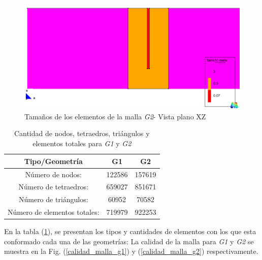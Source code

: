 \documentclass[10pt,a4paper,final]{article}
\begin{document}
%
\begin{figure}[tbhp]
\centerline{\includegraphics[scale=0.4]{img/200m/200_xz_tam_malla}}
\caption{Tamaños de los elementos de la malla \emph{G2}- Vista plano XZ}
\label{200_xz_tam_malla}
\end{figure}
%
%
\begin{table}[tbhp]
\begin{center}\begin{tabular}{ccc}
\hline \textbf{Tipo/Geometría} & \textbf{G1} & \textbf{G2} \\ 
\hline Número de nodos: & 122586 & 157619 \\ 
\hline Número de tetraedros: & 659027 & 851671\\ 
\hline Número de triángulos: & 60952  & 70582 \\ 
\hline Número de elementos totales: & 719979 & 922253 \\ 
\hline 
\end{tabular}\end{center}
\caption{Cantidad de nodos, tetraedros, triángulos y elementos totales para \emph{G1} y \emph{G2}}
\label{tabla_lista_elementos}
\end{table}
%
En la tabla (\ref{tabla_lista_elementos}), se presentan los tipos y cantidades de elementos con los que esta conformado cada una de las geometrías:
%
La calidad de la malla para \emph{G1} y \emph{G2} se muestra en la Fig. (\ref{calidad_malla_g1}) y (\ref{calidad_malla_g2}) respectivamente.
%
\end{document}
